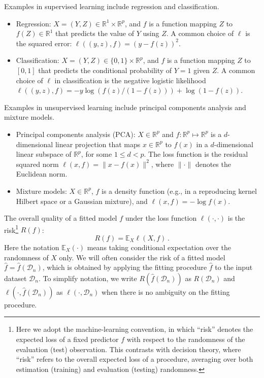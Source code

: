 \documentclass[11pt]{article}
\theoremstyle{plain}
\newcommand{\D}{{\mathcal{D}}}
\begin{document}
Examples in supervised learning include regression and classification.
\begin{itemize}
    \item Regression: $X=(Y,Z)\in\mathbb R^1\times \mathbb R^p$, and $f$ is a function mapping $Z$ to $f(Z)\in\mathbb R^1$ that predicts the value of $Y$ using $Z$. A common choice of $\ell$ is the squared error: $\ell((y,z),f)=(y-f(z))^2$.
    \item Classification: $X=(Y,Z)\in\{0,1\}\times \mathbb R^p$, and $f$ is a function mapping $Z$ to $[0,1]$ that predicts the conditional probability of $Y=1$ given $Z$. A common choice of $\ell$ in classification is the negative logistic likelihood  $\ell((y,z),f)=-y\log(f(z)/(1-f(z)))+\log(1-f(z))$.
\end{itemize}

Examples in unsupervised learning include principal components analysis and mixture models.
\begin{itemize}
    \item Principal components analysis (PCA): $X\in\mathbb R^p$ and $f:\mathbb R^p\mapsto\mathbb R^p$ is a $d$-dimensional linear projection that maps $x\in\mathbb R^p$ to $f(x)$ in a $d$-dimensional linear subspace of $\mathbb R^p$, for some $1\le d<p$. The loss function is the residual squared norm $\ell(x,f)=\|x-f(x)\|^2$, where $\|\cdot\|$ denotes the Euclidean norm.
    \item Mixture models: $X\in\mathbb R^p$, $f$ is a density function (e.g., in a reproducing kernel Hilbert space or a Gaussian mixture), and $\ell(x,f)=-\log f(x)$.
\end{itemize}

The overall quality of a fitted model $f$ under the loss function $\ell(\cdot,\cdot)$ is the risk\footnote{Here we adopt the machine-learning convention, in which ``risk'' denotes the expected loss of a fixed predictor \(f\) with respect to the randomness of the evaluation (test) observation. This contrasts with decision theory, where ``risk'' refers to the overall expected loss of a procedure, averaging over both estimation (training) and evaluation (testing) randomness.
} $R(f)$:
$$R(f)=\mathbb E_X \ell(X,f)\,.$$
Here the notation $\mathbb E_{X}(\cdot)$ means taking conditional expectation over the randomness of $X$ only.
We will often consider the risk of a fitted model $\hat f=\hat f(\D_n)$, which is obtained by applying the fitting procedure $\hat f$ to the input dataset $\D_n$. To simplify notation, we
write $R(\hat f(\D_n))$ as $R(\D_n)$ and $\ell(\cdot,\hat f(\D_n))$ as $\ell(\cdot,\D_n)$ when there is no ambiguity on the fitting procedure.
\end{document}
